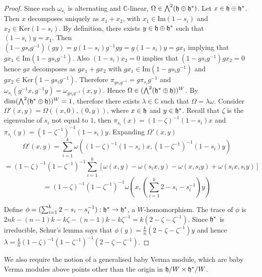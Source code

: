 \documentclass[a4apper,10pt]{amsart}
\theoremstyle{definition}
\numberwithin{thm}{section}
\newcommand{\C}{\mathbb{C}}
\renewcommand{\Im}{\textrm{Im}}
\renewcommand{\ker}{\textrm{Ker}}
\begin{document}
\begin{proof}
Since each $\omega_{s_i}$ is alternating and $\C$-linear, $\Omega \in
\bigwedge^2(\frak{h} \oplus \frak{h}^*)$. Let $x \in \frak{h} \oplus
\frak{h}^*$. Then $x$ decomposes uniquely as $x_1 + x_2$, with $x_1 \in \Im ( 1 - s_i)$ and $x_2 \in \ker (1 - s_i)$. By definition, there exists $y \in \frak{h} \oplus \frak{h}^*$
such that $(1 - s_i)y = x_1$. Then $(1 - gs_ig^{-1})(gy) = g(1 -
s_i)g^{-1}gy = g(1 - s_i)y = gx_1$ implying that $gx_1 \in \Im( 1 -
gs_ig^{-1})$. Also $(1 - s_i)x_2 = 0$ implies that $(1 -
gs_ig^{-1})gx_2 = 0$ hence $gx$ decomposes as $gx_1 + gx_2$ with $gx_1
\in \Im(1 - gs_ig^{-1})$ and $gx_2 \in \ker(1 - gs_ig^{-1})$. Therefore
$\pi_{gs_ig^{-1}} = g \pi_{s_i} g^{-1}$ and $\omega_{s_i} (g^{-1} x, g^{-1} y) = \omega_{gs_ig^{-1}}(x,y)$. Hence $\Omega \in (\bigwedge^2 (\frak{h}^*
\oplus \frak{h}))^W$. By \cite[Lemma 2.23]{1} $\dim (\bigwedge^2 (\frak{h}^*
\oplus \frak{h}))^W = 1$, therefore there exists $\lambda \in \C$ such
that $\Omega = \lambda \omega$. Consider $\Omega'(x,y) = \Omega((x,0),(0,y))$, where $x \in \frak{h}$
and $y \in \frak{h}^*$. Recall that $\zeta$ is the eigenvalue of $s_i$ not equal to $1$, then $\pi_{s_i}(x) = (1 - \zeta)^{-1}(1 - s_i)x$ and $\pi_{s_i}(y) = (1 - \zeta^{-1})^{-1}(1 - s_i)y$. Expanding
$\Omega'(x,y)$
\begin{displaymath}
\Omega'(x,y) = \sum_{i = 1}^k \omega((1 - \zeta)^{-1}(1 - s_i)x,(1 -
\zeta^{-1})^{-1}(1 - s_i)y)
\end{displaymath}
\begin{displaymath}
= (1 - \zeta)^{-1}(1 - \zeta^{-1})^{-1}
\sum_{i = 1}^k \left[\omega(x,y) - \omega(s_ix,y) - \omega(x,s_iy) +
\omega(s_ix,s_iy)\right]
\end{displaymath}
\begin{displaymath}
= (1 - \zeta)^{-1}(1 - \zeta^{-1})^{-1} \omega(x, (\sum_{i = 1}^k 2 - s_i - s_i^{-1})y)
\end{displaymath} 

\noindent Define $\phi = (\sum_{i = 1}^k 2 - s_i - s_i^{-1}) : \frak{h}^*
\rightarrow \frak{h}^*$, a $W$-homomorphism. The trace of $\phi$
is $2nk - (n-1)k - k\zeta - (n-1)k - k\zeta^{-1} = k(2 - \zeta -
\zeta^{-1})$. Since $\frak{h}^*$ is irreducible, Schur's lemma says
that $\phi(y) = \frac{k}{n}(2 - \zeta - \zeta^{-1})y$ and hence $\lambda = \frac{k}{n}(1 - \zeta)^{-1}(1 - \zeta^{-1})^{-1}(2 - \zeta - \zeta^{-1})$. 
\end{proof}

\noindent We also require the notion of a generalised baby Verma module, which are baby Verma modules above points other than the origin in $\frak{h}/W \times \frak{h}^*/W$.
\end{document}
